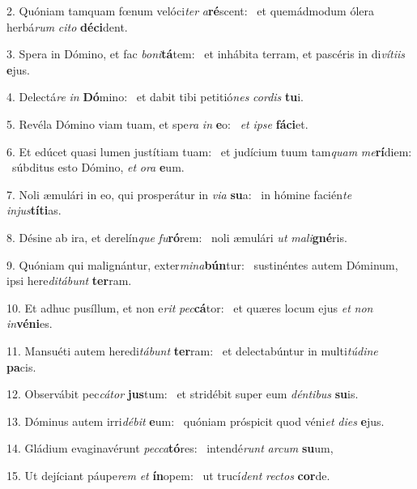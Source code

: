 2. Quóniam tamquam fœnum velóci\textit{ter} \textit{a}\textbf{ré}scent: \ast\  et quemádmodum ólera herbá\textit{rum} \textit{ci}\textit{to} \textbf{dé}\textbf{ci}dent.\

3. Spera in Dómino, et fac \textit{bo}\textit{ni}\textbf{tá}tem: \ast\  et inhábita terram, et pascéris in di\textit{ví}\textit{ti}\textit{is} \textbf{e}jus.\

4. Delectá\textit{re} \textit{in} \textbf{Dó}mino: \ast\  et dabit tibi petitió\textit{nes} \textit{cor}\textit{dis} \textbf{tu}i.\

5. Revéla Dómino viam tuam, et spe\textit{ra} \textit{in} \textbf{e}o: \ast\  \textit{et} \textit{ip}\textit{se} \textbf{fá}\textbf{ci}et.\

6. Et edúcet quasi lumen justítiam tuam: \dag\  et judícium tuum tam\textit{quam} \textit{me}\textbf{rí}diem: \ast\  súbditus esto Dómino, \textit{et} \textit{o}\textit{ra} \textbf{e}um.\

7. Noli æmulári in eo, qui prosperátur in \textit{vi}\textit{a} \textbf{su}a: \ast\  in hómine facién\textit{te} \textit{in}\textit{jus}\textbf{tí}\textbf{ti}as.\

8. Désine ab ira, et derelín\textit{que} \textit{fu}\textbf{ró}rem: \ast\  noli æmulári \textit{ut} \textit{ma}\textit{li}\textbf{gné}ris.\

9. Quóniam qui malignántur, exter\textit{mi}\textit{na}\textbf{bún}tur: \ast\  sustinéntes autem Dóminum, ipsi here\textit{di}\textit{tá}\textit{bunt} \textbf{ter}ram.\

10. Et adhuc pusíllum, et non e\textit{rit} \textit{pec}\textbf{cá}tor: \ast\  et quæres locum ejus \textit{et} \textit{non} \textit{in}\textbf{vé}\textbf{ni}es.\

11. Mansuéti autem heredi\textit{tá}\textit{bunt} \textbf{ter}ram: \ast\  et delectabúntur in multi\textit{tú}\textit{di}\textit{ne} \textbf{pa}cis.\

12. Observábit pec\textit{cá}\textit{tor} \textbf{jus}tum: \ast\  et stridébit super eum \textit{dén}\textit{ti}\textit{bus} \textbf{su}is.\

13. Dóminus autem irri\textit{dé}\textit{bit} \textbf{e}um: \ast\  quóniam próspicit quod véni\textit{et} \textit{di}\textit{es} \textbf{e}jus.\

14. Gládium evaginavérunt \textit{pec}\textit{ca}\textbf{tó}res: \ast\  intendé\textit{runt} \textit{ar}\textit{cum} \textbf{su}um,\

15. Ut dejíciant páupe\textit{rem} \textit{et} \textbf{ín}opem: \ast\  ut trucí\textit{dent} \textit{rec}\textit{tos} \textbf{cor}de.\

